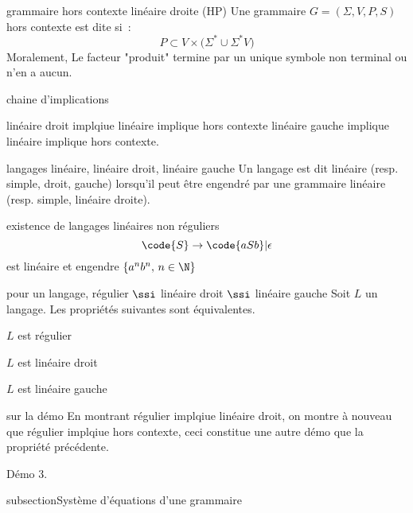 \begin{adjustwidth}{-3cm}{-3cm}
\begin{definition}{}{grammaire hors contexte linéaire droite (HP)}
    Une grammaire $G = (\Sigma, V, P, S)$ hors contexte est dite  si~:
        $$P \subset V \times \big( \Sigma^* \cup \Sigma^*V \big)$$
    Moralement, Le facteur "produit" termine par un unique symbole non terminal ou n'en a aucun.
\end{definition}

\begin{remarque}{}{chaine d'implications}

    linéaire droit implqiue linéaire implique hors contexte
    linéaire gauche implique linéaire implique hors contexte.
    
\end{remarque}

\begin{definition}{}{langages linéaire, linéaire droit, linéaire gauche}
    Un langage est dit linéaire (resp. simple, droit, gauche) lorsqu'il peut être engendré par une grammaire linéaire (resp. simple, linéaire droite).
\end{definition}

\begin{remarque}{}{existence de langages linéaires non réguliers}
    $$\code{S} \rightarrow \code{aSb} \vert \epsilon$$ est linéaire et engendre $\{a^n b^n,\, n \in \N\}$
\end{remarque}

\begin{proposition}{}{pour un langage, régulier $\ssi$ linéaire droit $\ssi$ linéaire gauche} 
    Soit $L$ un langage. Les propriétés suivantes sont équivalentes.
    \begin{enumeratebf}
        \item $L$ est régulier
        \item $L$ est linéaire droit
        \item $L$ est linéaire gauche
    \end{enumeratebf}
\end{proposition}

\begin{remarque}{}{sur la démo}
    En montrant régulier implqiue linéaire droit, on montre à nouveau que régulier implqiue hors contexte, ceci constitue une autre démo que la propriété précédente.
\end{remarque}

Démo 3.

subsection{Système d'équations d'une grammaire}


\end{adjustwidth}
